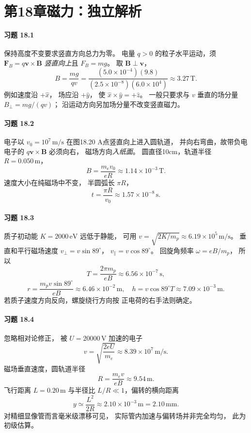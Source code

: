 \section*{第18章\quad 磁力：独立解析}

\paragraph{习题 18.1}
保持高度不变要求竖直方向总力为零。
电量 \(q>0\) 的粒子水平运动，须
\(\boldsymbol F_B=q\boldsymbol v\times\boldsymbol B\)
\emph{竖直向上}且 \(F_B=mg\)。
取 \(\boldsymbol B\perp\boldsymbol v\)，
\[
 \boxed{B=\frac{mg}{qv}
 =\frac{(5.0\times10^{-4})(9.8)}
 {(2.5\times10^{-8})(6.0\times10^4)}
 \approx3.27\,\mathrm T}.
\]
例如速度沿 \(+\hat x\)，
场应沿 \(+\hat y\)，
使 \(\hat x\times\hat y=+\hat z\)。
一般只要求与 \(v\) 垂直的场分量
\(B_\perp=mg/(qv)\)；
沿运动方向另加场分量不改变竖直磁力。

\paragraph{习题 18.2}
电子以 \(v_0=10^7\,\mathrm{m/s}\)
在图18.20 A点竖直向上进入圆轨道，
并向右弯曲，故带负电电子的
\(q\boldsymbol v\times\boldsymbol B\)
必须向右，
磁场方向\emph{入纸面}。
圆直径10cm，轨道半径
\(R=0.050\,\mathrm m\)，
\[
 \boxed{B=\frac{m_ev_0}{eR}
 \approx1.14\times10^{-3}\,\mathrm T}.
\]
速度大小在纯磁场中不变，
半圆弧长 \(\pi R\)，
\[
 \boxed{t=\frac{\pi R}{v_0}
 \approx1.57\times10^{-8}\,\mathrm s}.
\]

\paragraph{习题 18.3}
质子初动能 \(K=2000\,\mathrm{eV}\)
远低于静能，
可用 \(v=\sqrt{2K/m_p}
 \approx6.19\times10^5\,\mathrm{m/s}\)。
垂直和平行磁场速度
\(v_\perp=v\sin89^\circ\)，
\(v_\parallel=v\cos89^\circ\)。
回旋角频率
\(\omega=eB/m_p\)，
所以
\[
 \boxed{T=\frac{2\pi m_p}{eB}
 \approx6.56\times10^{-7}\,\mathrm s},
\]
\[
 \boxed{r=\frac{m_pv\sin89^\circ}{eB}
 \approx6.46\times10^{-2}\,\mathrm m},
\quad
 \boxed{h=v\cos89^\circ T
 \approx7.09\times10^{-3}\,\mathrm m}.
\]
若质子速度方向反向，螺旋绕行方向按
正电荷的右手法则确定。

\paragraph{习题 18.4}
忽略相对论修正，
被 \(U=20000\,\mathrm V\) 加速的电子
\[
 v=\sqrt{\frac{2eU}{m_e}}
 \approx8.39\times10^7\,\mathrm{m/s}.
\]
磁场垂直速度，圆轨道半径
\[
 R=\frac{m_ev}{eB}\approx9.54\,\mathrm m.
\]
飞行距离 \(L=0.20\,\mathrm m\) 与半径比
\(L/R\ll1\)，偏转的横向距离
\[
 \boxed{y\simeq\frac{L^2}{2R}
 \approx2.10\times10^{-3}\,\mathrm m
 =2.10\,\mathrm{mm}}.
\]
对精细显像管而言毫米级漂移可见，
实际管内加速与偏转场并非完全均匀，
此为初级估算。

